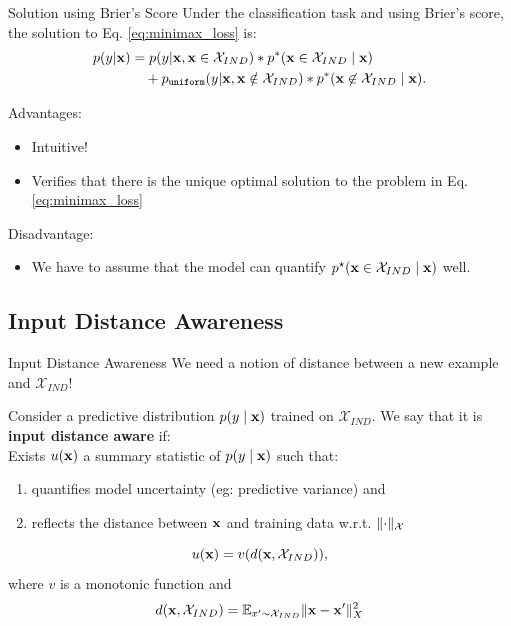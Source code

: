 \documentclass[xcolor=table]{beamer}
\newcommand{\pred}{p(y \mid \bx)}
\newcommand{\xind}{\mathcal X_{IND}}
\DeclarePairedDelimiter\norm{\lVert}{\rVert}%
\begin{document}
\begin{frame}{Solution using Brier's Score}
    Under the classification task and using Brier's score, the solution to Eq. \eqref{eq:minimax_loss} is:
    \begin{align*}
    p(y |\bx) 
    &= 
    p(y|\bx, \bx \in \xind) * p^*(\bx \in \xind \mid \bx) \\
    &  \quad+ 
    p_{\textup{\texttt{uniform}}}(y|\bx, \bx \notin \xind) * p^*(\bx \not\in \xind \mid \bx).
    \label{eq:minimax_solution}
\end{align*}

Advantages:
\begin{itemize}
    \item Intuitive!
    \item Verifies that there is the unique optimal solution to the problem in Eq. \eqref{eq:minimax_loss}
\end{itemize}
Disadvantage:
\begin{itemize}
\item We have to assume that the model can quantify \(p^\star (\bx \in \xind \mid \bx)\) well.
\end{itemize}

\end{frame}

\subsection{Input Distance Awareness}

\begin{frame}{Input Distance Awareness}
    We need a notion of distance between a new example and \(\xind\)!
    \pause

    \begin{definition}
        Consider a predictive distribution \(p(y \mid {\mathbf x})\) trained on \(\xind\). We say that it is \textbf{input distance aware} if:\\
        
            Exists \(u({\mathbf x})\) a summary statistic of \(\pred\) such that:
        \begin{enumerate}
            \item quantifies model uncertainty (eg: predictive variance) and
            \item reflects the distance between \({\mathbf x}\) and training data w.r.t. \(\norm{\cdot}_{\mathcal X}\)
        \end{enumerate}
        \[
        u(\bx) = v(d(\bx, \xind)),
        \]
        where \(v\) is a monotonic function and 
        \[d(\bx,\xind) = \mathbb E_{x' \sim \xind} \norm{\bx -\bx'}^2_{X}
        \]
    \end{definition}
\end{frame}
\end{document}
